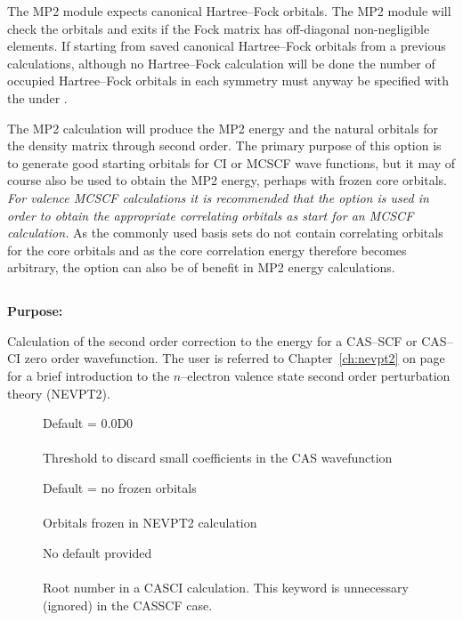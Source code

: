 

The MP2 module expects canonical Hartree--Fock orbitals. The MP2 module will
check the orbitals and exits if the Fock matrix has off-diagonal non-negligible
elements.
If starting from saved canonical Hartree--Fock orbitals from a previous calculations,
although no Hartree--Fock calculation will be done
the number of occupied Hartree--Fock orbitals in each symmetry must anyway be
specified with the  under .

The MP2 calculation will produce the MP2 energy and the natural orbitals
for the density matrix through second order.  The primary purpose of
this option is to generate good starting orbitals for CI or MCSCF wave
functions, but it
may of course also be used to obtain the MP2 energy, perhaps with frozen
core orbitals. {\em For valence MCSCF calculations it is recommended that the
 option is used in order to obtain the appropriate
correlating orbitals as start
for an MCSCF calculation.\/}  As the commonly
used basis sets do not contain correlating orbitals for the core
orbitals and as the core correlation energy therefore becomes arbitrary,
the  option can also be of benefit in MP2 energy
calculations.

\pagebreak[3]
\subsection{\label{ref-nevpt2inp}}

{\bf Purpose:}

Calculation of the second order correction to the energy for a
CAS--SCF or CAS--CI zero order wavefunction.
The user is referred to Chapter~\ref{ch:nevpt2} on
page~\pageref{ch:nevpt2}  for a brief
introduction to the $n$--electron valence state second order
perturbation theory (NEVPT2).

\begin{description}
\item[]
 Default = 0.0D0\\
   \\
  Threshold to discard small coefficients in the CAS wavefunction


\item[]
  Default = no frozen orbitals\\
   \\
  Orbitals frozen in NEVPT2 calculation

\item[]
 No default provided\\
 \\
Root number in a CASCI calculation. This keyword is unnecessary
(ignored) in the CASSCF case.
\end{description}


